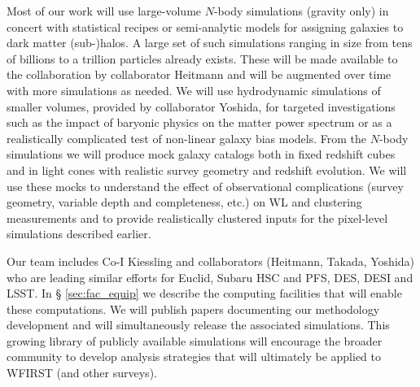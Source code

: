 Most of our work will use large-volume $N$-body simulations (gravity only) in concert
with statistical recipes or semi-analytic models for assigning
galaxies to dark matter (sub-)halos. A large set of such simulations ranging in size from tens of billions to a trillion particles already exists. These will be made available to the collaboration by collaborator Heitmann and will be augmented over time with more simulations as needed.
We will use hydrodynamic simulations
of smaller volumes, provided by collaborator Yoshida, for targeted investigations such as the impact of
baryonic physics on the matter power spectrum or as a realistically
complicated test of non-linear galaxy bias models.
From the $N$-body simulations we will produce mock galaxy catalogs
both in fixed redshift cubes and in light cones with realistic survey
geometry and redshift evolution.
We will use these mocks to understand the effect of observational complications
(survey geometry, variable depth and completeness, etc.) on WL and clustering
measurements and to provide realistically clustered inputs for the pixel-level
simulations described earlier.


Our team includes
Co-I Kiessling and collaborators (Heitmann, Takada, Yoshida) who are leading similar efforts
for Euclid, Subaru HSC and PFS, DES, DESI and LSST. In \S
\ref{sec:fac_equip} we describe the computing facilities that will
enable these computations.
We will publish papers documenting our methodology development and
will simultaneously release the associated simulations.
This growing library of publicly available simulations will encourage
the broader community to develop analysis strategies that will
ultimately be applied to WFIRST (and other surveys).

